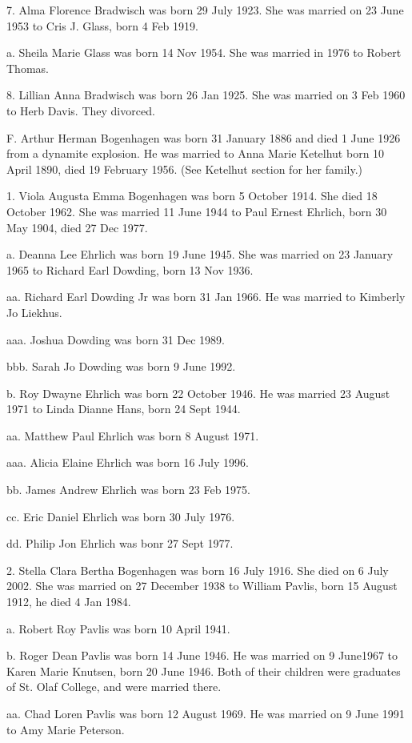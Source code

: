 \documentclass[a4paper]{article}
\begin{document}
7. Alma Florence Bradwisch was born 29 July 1923.  She was married on 23 June 1953 to Cris J. Glass, born 4 Feb 1919.
 
a. Sheila Marie Glass was born 14 Nov 1954.  She was married in 1976 to Robert  Thomas.
 
8. Lillian Anna Bradwisch was born 26 Jan 1925.  She was married on 3 Feb 1960 to Herb Davis.  They divorced.
 
F. Arthur Herman Bogenhagen was born 31 January 1886 and died 1 June 1926 from a dynamite explosion.  He was married to Anna Marie Ketelhut born 10 April 1890, died 19 February 1956.  (See Ketelhut section for her family.)

1. Viola Augusta Emma Bogenhagen was born 5 October 1914.  She died 18 October 1962.  She was married 11 June 1944 to Paul Ernest Ehrlich, born 30 May 1904, died 27 Dec 1977.

a. Deanna Lee Ehrlich was born 19 June 1945.  She was married on 23 January 1965 to Richard Earl Dowding, born 13 Nov 1936.

aa. Richard Earl Dowding Jr was born 31 Jan 1966. He was married to Kimberly Jo Liekhus.

aaa. Joshua Dowding was born 31 Dec 1989.

bbb. Sarah Jo Dowding was born 9 June 1992. 

b. Roy Dwayne Ehrlich was born 22 October 1946.  He was married 23 August 1971 to Linda Dianne Hans, born 24 Sept 1944.

aa. Matthew Paul Ehrlich was born 8 August 1971.

aaa. Alicia Elaine Ehrlich was born 16 July 1996.

bb. James Andrew Ehrlich was born 23 Feb 1975.

cc. Eric Daniel Ehrlich was born 30 July 1976.

dd. Philip Jon Ehrlich was bonr 27 Sept 1977.

2. Stella Clara Bertha Bogenhagen was born 16 July 1916. She died on 6 July 2002.  She was married on 27 December 1938 to William Pavlis, born 15 August 1912, he died 4 Jan 1984.

a. Robert Roy Pavlis was born 10 April 1941.

b. Roger Dean Pavlis was born 14 June 1946.  He was married on 9 June1967 to Karen Marie Knutsen, born 20 June 1946.  Both of their children were graduates of St. Olaf College, and were married there.

aa. Chad Loren Pavlis was born 12 August 1969.  He was married on 9 June 1991 to Amy Marie Peterson.
\end{document}
